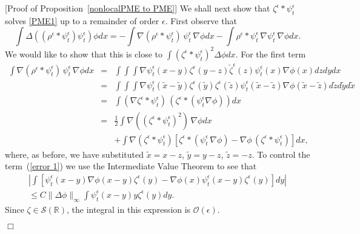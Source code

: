 \documentclass[12pt]{article}
\newenvironment {proof}{{\noindent\bf Proof }}{\hfill $\Box$ \medskip}
\def \tilde{\widetilde}
\newcommand{\IR}{\mathbb R}
\numberwithin{equation}{section}
\begin{document}
\begin{proof}[Proof of Proposition~\ref{nonlocalPME to PME}]
We shall next show that $\zeta^\epsilon * \psi_t^\epsilon$ solves \eqref{PME1}
up to a remainder of order $\epsilon$.
First observe that
\begin{equation}
\label{total equation}
\int\Delta\left((\rho^{\epsilon}*\psi_t^\epsilon)\psi_t^\epsilon\right)\phi  dx
    =
    - \int \nabla(\rho^{\epsilon}*\psi_t^\epsilon)\, \psi_t^\epsilon\,\nabla\phi dx
    -\int \rho^{\epsilon}*\psi_t^\epsilon \,\nabla \psi_t^\epsilon \, \nabla\phi dx.
\end{equation}
We would like to show that this is close to $\int (\zeta^\epsilon * \psi^\epsilon_t)^2 \Delta \phi dx$.
For the first term
\begin{eqnarray}
\nonumber
\int \nabla(\rho^{\epsilon}*\psi_t^\epsilon)\, \psi_t^\epsilon\, \nabla\phi  dx
&=&
\int\int\int\nabla \psi_t^\epsilon(x-y)\zeta^{\epsilon}(y-z)
\check{\zeta}^{\epsilon}(z)
\psi_t^\epsilon(x)\nabla\phi(x) dz  dy  dx
\\
\nonumber
&=&
\int\int\int\nabla \psi_t^\epsilon(\tilde{x}-\tilde{y})
\zeta^{\epsilon}(\tilde{y})
\zeta^{\epsilon}(\tilde{z})\psi_t^\epsilon(\tilde{x}-\tilde{z})
\nabla\phi(\tilde{x}-\tilde{z}) d\tilde{z} d\tilde{y} d\tilde{x}
\\
\nonumber
&=&\int(\nabla \zeta^{\epsilon}*\psi_t^\epsilon)\,
\left(\zeta^{\epsilon}*(\psi_t^\epsilon\nabla\phi)\right)
d x\\
\nonumber
&=&
\frac{1}{2}\int\nabla ((\zeta^{\epsilon}*\psi_t^\epsilon)^2)
\,\nabla\phi  dx
\\
\label{error 1}
&&+
\int\nabla(\zeta^{\epsilon}*\psi_t^\epsilon)
\left[\zeta^{\epsilon}*(\psi_t^\epsilon\,\nabla\phi)-
\nabla\phi\,(\zeta^{\epsilon}*\psi_t^\epsilon)\right] dx,
\end{eqnarray}
where, as before, we have substituted $\tilde{x}=x-z$, $\tilde{y}=y-z$,
$\tilde{z}=-z$.
To control the term~(\ref{error 1})
we use the Intermediate Value Theorem to see that
\begin{multline*}
\left|\int\left[\psi_t^\epsilon(x-y)\nabla\phi(x-y)\zeta^{\epsilon}(y)-
\nabla\phi(x)\psi_t^\epsilon(x-y)\zeta^{\epsilon}(y)
\right] dy\right|
\\
\leq C\|\Delta\phi\|_\infty\int \psi_t^\epsilon (x-y)y\zeta^{\epsilon}(y) d y.
\end{multline*}
Since $\zeta\in\mathcal{S}(\IR)$, 
the integral in this expression is
$\mathcal{O}(\epsilon)$.


\end{proof}
\end{document}

